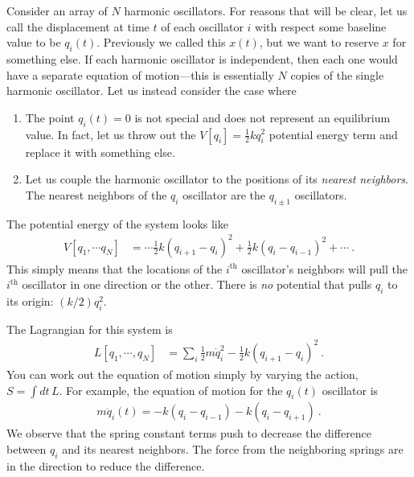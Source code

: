 Consider an array of $N$ harmonic oscillators. For reasons that will be clear, let us call the displacement at time $t$ of each oscillator $i$ with respect some baseline value to be $q_i(t)$. Previously we called this $x(t)$, but we want to reserve $x$ for something else. If each harmonic oscillator is independent, then each one would have a separate equation of motion---this is essentially $N$ copies of the single harmonic oscillator. Let us instead consider the case where
\begin{enumerate}
    \item The point $q_i(t)=0$ is not special and does not represent an equilibrium value. In fact, let us throw out the $V[q_i]=\frac{1}{2}kq_i^2$ potential energy term and replace it with something else.
    \item Let us couple the harmonic oscillator to the positions of its \emph{nearest neighbors}. The nearest neighbors of the $q_i$ oscillator are the $q_{i\pm 1}$ oscillators. 
\end{enumerate}
The potential energy of the system looks like
\begin{align}
    V[q_1,\cdots q_N] &=
    \cdots
    \frac{1}{2}k(q_{i+1}-q_i)^2 +
    \frac{1}{2}k(q_{i}-q_{i-1})^2 +
    \cdots \ .
\end{align}
This simply means that the locations of the $i^\text{th}$ oscillator's neighbors will pull the $i^{\text{th}}$ oscillator in one direction or the other. There is \emph{no} potential that pulls $q_i$ to its origin: $(k/2)q_i^2$. 


The Lagrangian  for this system is
\begin{align}
    L[q_1,\cdots, q_N]
    &= 
    \sum_i \frac{1}{2} m \dot q_i^2 - \frac{1}{2}k (q_{i+1}-q_i)^2 \ .
\end{align}
You can work out the equation of motion simply by varying the action, $S=\int dt\,L$. For example, the equation of motion for the $q_i(t)$ oscillator is
\begin{align}
    m\ddot{q}_i(t) = -k(q_{i}-q_{i-1}) -k(q_{i}-q_{i+1}) \ .
\end{align}
We observe that the spring constant terms push to decrease the difference between $q_i$ and its nearest neighbors. The force from the neighboring springs are in the direction to reduce the difference.


